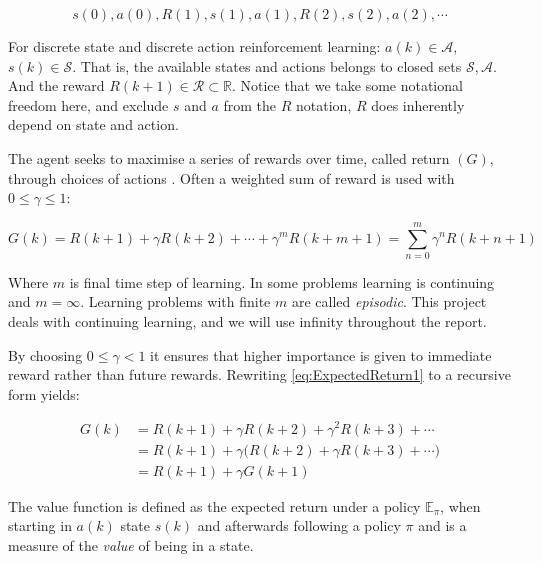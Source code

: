 \begin{equation}
	s(0), a(0), R(1), s(1), a(1), R(2), s(2), a(2),\cdots	
\end{equation}

For discrete state and discrete action reinforcement learning: $ a(k)\in \mathcal{A} $, $s(k)\in \mathcal{S} $. That is, the available states and actions belongs to closed sets $\mathcal{S,A}$. And the reward $ R(k+1) \in \mathcal{R} \subset \mathbb{R} $. Notice that we take some notational freedom here, and exclude $s$ and $a$ from the $R$ notation, $R$ does inherently depend on state and action.

The agent seeks to maximise a series of rewards over time, called return $(G)$, through choices of actions \cite{Sutton2020}. Often a weighted sum of reward is used with $0 \leq \gamma \leq 1$:

\begin{equation}\label{eq:ExpectedReturn1}
	G(k)=R(k+1)
	+\gamma R(k+2)
	+\cdots
	+\gamma^{m}R(k+m+1)
	=\sum_{n=0}^{m}\gamma^{n}R(k+n+1)
\end{equation}

Where $ m $ is final time step of learning. In some problems learning is continuing and $m = \infty$. Learning problems with finite $m$ are called \textit{episodic}. This project deals with continuing learning, and we will use infinity throughout the report. 

By choosing $0 \leq \gamma < 1$ it ensures that higher importance is given to immediate reward rather than future rewards. Rewriting \cref{eq:ExpectedReturn1} to a recursive form yields:

\begin{equation}\label{eq:ExpectedReturn2}
	\begin{split}
			G(k)&=R(k+1)+\gamma R(k+2)+\gamma^2 R(k+3)+\cdots\\
			    &=R(k+1)+\gamma\big(R(k+2)+\gamma R(k+3)+\cdots\big)\\
			    &=R(k+1)+\gamma G(k+1)
	\end{split}
\end{equation}

The value function is defined as the expected return under a policy $ \mathbb{E}_{\pi} $, when starting in $a(k)$ state $ s(k) $ and afterwards following a policy $ \pi $ and is a measure of the \textit{value} of being in a state.   


